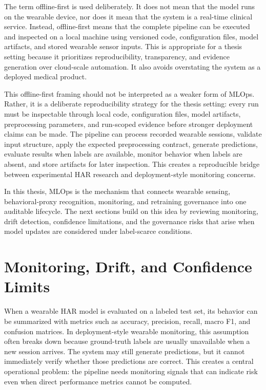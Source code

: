The term offline-first is used deliberately. It does not mean that the model runs on the wearable device, nor does it mean that the system is a real-time clinical service. Instead, offline-first means that the complete pipeline can be executed and inspected on a local machine using versioned code, configuration files, model artifacts, and stored wearable sensor inputs. This is appropriate for a thesis setting because it prioritizes reproducibility, transparency, and evidence generation over cloud-scale automation. It also avoids overstating the system as a deployed medical product.

This offline-first framing should not be interpreted as a weaker form of MLOps. Rather, it is a deliberate reproducibility strategy for the thesis setting: every run must be inspectable through local code, configuration files, model artifacts, preprocessing parameters, and run-scoped evidence before stronger deployment claims can be made. The pipeline can process recorded wearable sessions, validate input structure, apply the expected preprocessing contract, generate predictions, evaluate results when labels are available, monitor behavior when labels are absent, and store artifacts for later inspection. This creates a reproducible bridge between experimental HAR research and deployment-style monitoring concerns.

In this thesis, MLOps is the mechanism that connects wearable sensing, behavioral-proxy recognition, monitoring, and retraining governance into one auditable lifecycle. The next sections build on this idea by reviewing monitoring, drift detection, confidence limitations, and the governance risks that arise when model updates are considered under label-scarce conditions.



\section{Monitoring, Drift, and Confidence Limits}

When a wearable HAR model is evaluated on a labeled test set, its behavior can be summarized with metrics such as accuracy, precision, recall, macro F1, and confusion matrices. In deployment-style wearable monitoring, this assumption often breaks down because ground-truth labels are usually unavailable when a new session arrives. The system may still generate predictions, but it cannot immediately verify whether those predictions are correct. This creates a central operational problem: the pipeline needs monitoring signals that can indicate risk even when direct performance metrics cannot be computed.

